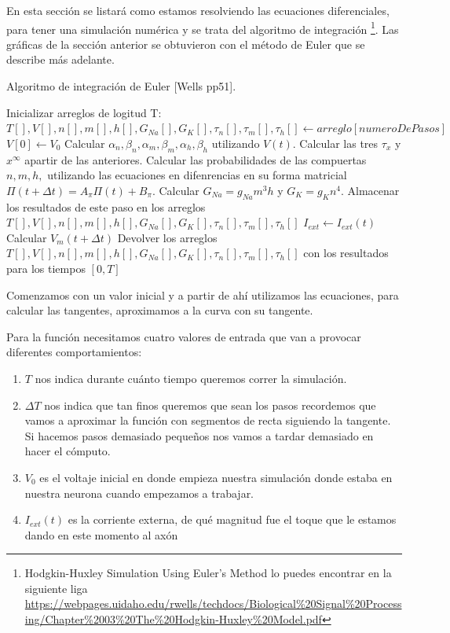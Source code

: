En esta sección se listará como estamos resolviendo las ecuaciones diferenciales, para tener una simulación numérica y se trata del algoritmo de integración \footnote{Hodgkin-Huxley Simulation Using Euler's Method lo puedes encontrar en la siguiente liga \url{https://webpages.uidaho.edu/rwells/techdocs/Biological\%20Signal\%20Processing/Chapter\%2003\%20The\%20Hodgkin-Huxley\%20Model.pdf}}. Las gráficas de la sección anterior se obtuvieron con el método de Euler que se describe más adelante.

\begin{algorithm}
  \caption{Algoritmo de integración de Euler [Wells pp51].}\label{AIE}
  \begin{algorithmic}[1]
    \State Inicializar arreglos de logitud T: $T[],V[],n[],m[],h[],G_{Na}[],G_{K}[],\tau_{n}[],\tau_{m}[],\tau_{h}[] \gets arreglo[numeroDePasos] $
    \State  $V[0] \gets V_{0}$
        \State Calcular $\alpha_{n}, \beta_{n}, \alpha_{m}, \beta_{m},\alpha_{h}, \beta_{h} $ utilizando $V(t)$.
        \State Calcular las tres $\tau_{x} $ y $x^\infty $ apartir de las anteriores.
        \State Calcular las probabilidades de las compuertas $n, m, h, $ utilizando las ecuaciones en difenrencias en su forma matricial $\Pi(t + \Delta t) = A_{\pi}\Pi(t) + B_{\pi}$.
        \State Calcular $G_{Na} = g_{Na}m^3h $ y $G_{K} = g_{K}n^4 $.
        \State Almacenar los resultados de este paso en los arreglos $T[],V[],n[],m[],h[],G_{Na}[],G_{K}[],\tau_{n}[],\tau_{m}[],\tau_{h}[] $
        \State $I_{ext} \gets I_{ext}(t) $
        \State Calcular $V_{m} (t + \Delta t) $
    \EndFor
    \State Devolver los arreglos $T[],V[],n[],m[],h[],G_{Na}[],G_{K}[],\tau_{n}[],\tau_{m}[],\tau_{h}[] $ con los resultados para los tiempos $[0,T] $
    \EndFunction
  \end{algorithmic}
\end{algorithm}


Comenzamos con un valor inicial y a partir de ahí utilizamos las ecuaciones, para calcular las tangentes, aproximamos a la curva con su tangente.

Para la función  necesitamos cuatro valores de entrada que  van a provocar diferentes comportamientos:

\begin{enumerate}
 \item $T$ nos indica durante cuánto tiempo queremos correr la simulación.
 \item $\Delta T $ nos indica  que tan finos queremos que sean los pasos recordemos que vamos a aproximar la función con segmentos de recta siguiendo la tangente. Si hacemos pasos demasiado pequeños nos vamos a tardar demasiado en hacer el cómputo.
 \item $V_{0} $ es el voltaje inicial en donde empieza nuestra simulación donde estaba en nuestra neurona cuando empezamos a trabajar.
 \item $I_{ext}(t) $ es la corriente externa, de qué magnitud fue el toque que le estamos dando en este momento al axón 

\end{enumerate}

